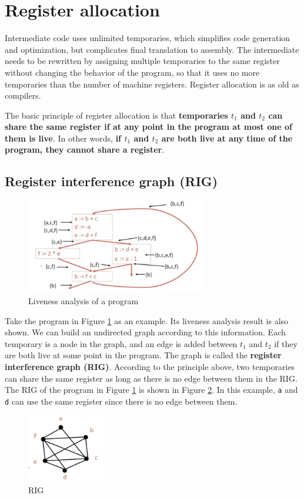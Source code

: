 \section{Register allocation}
Intermediate code uses unlimited temporaries, which simplifies code generation and optimization, but complicates final translation to assembly. The intermediate needs to be rewritten by assigning multiple temporaries to the same register without changing the behavior of the program, so that it uses no more temporaries than the number of machine registers. Register allocation is as old as compilers. 

The basic principle of register allocation is that \textbf{temporaries $t_1$ and $t_2$ can share the same register if at any point in the program at most one of them is live}. In other words, \textbf{if $t_1$ and $t_2$ are both live at any time of the program, they cannot share a register}.
\subsection{Register interference graph (RIG)}
\begin{figure}[ht]
\centering
\includegraphics[width=0.7\textwidth]{liveness.jpg}
\caption{Liveness analysis of a program}\label{liveness}
\end{figure}

Take the program in Figure \ref{liveness} as an example. Its liveness analysis result is also shown. We can build an undirected graph according to this information. Each temporary is a node in the graph, and an edge is added between $t_1$ and $t_2$ if they are both live at some point in the program. The graph is called the \textbf{register interference graph (RIG)}. According to the principle above, two temporaries can share the same register as long as there is no edge between them in the RIG. The RIG of the program in Figure \ref{liveness} is shown in Figure \ref{rig}. In this example, \texttt{a} and \texttt{d} can use the same register since there is no edge between them.
\begin{figure}[ht]
\centering
\includegraphics[width=0.3\textwidth]{rig.jpg}
\caption{RIG}\label{rig}
\end{figure}

